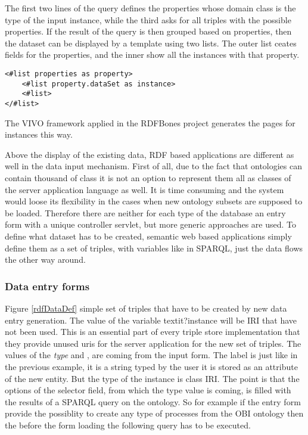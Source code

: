 The first two lines of the query defines the properties whose domain class is the type of the input instance, while the third asks for all triples with the possible properties. If the result of the query is then grouped based on properties, then the dataset can be displayed by a template using two lists. The outer list ceates fields for the properties, and the inner show all the instances with that property.


\begin{lstlisting}[captionpos=b, caption=Ontology adaptive template file, label=template,
basicstyle=\footnotesize,frame=single]
<#list properties as property>
	<#list property.dataSet as instance> 
	<#list> 
</#list>
\end{lstlisting}

The VIVO framework applied in the RDFBones project generates the pages for instances this way.


Above the display of the existing data, RDF based applications are different as well in the data input mechanism. First of all, due to the fact that ontologies can contain thousand of class it is not an option to represent them all as classes of the server application language as well. It is time consuming and the system would loose its flexibility in the cases when new ontology subsets are supposed to be loaded. Therefore there are neither for each type of the database an entry form with a unique controller servlet, but more generic approaches are used.
To define what dataset has to be created, semantic web based applications simply define them as a set of triples, with variables like in SPARQL, just the data flows the other way around.


\subsubsection{Data entry forms} \label{233}


Figure \ref{rdfDataDef} simple set of triples that have to be created by new data entry generation. The value of the variable textit{?instance} will be IRI that have not been used. This is an essential part of every triple store implementation that they provide unused uris for the server application for the new set of triples. The values of the \textit{type} and , 
are coming from the input form. The label is just like in the previous example, it is a string typed by the user it is stored as an attribute of the new entity. But the type of the instance is class IRI. The point is that the options of the selector field, from which the type value is coming, is filled with the results of a SPARQL query on the ontology. So for example if the entry form provide the possiblity to create any type of processes from the OBI ontology then the before the form loading the following query has to be executed.

